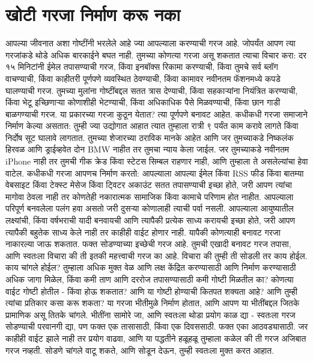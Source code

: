 \chapter{खोटी गरजा निर्माण करू नका}
आपल्या जीवनात अशा गोष्टींनी भरलेले आहे ज्या आपल्याला करण्याची गरज आहे. जोपर्यंत आपण त्या गरजांकडे थोडे अधिक बारकाईने बघत नाही.
तुमच्या कोणत्या गरजा असू शकतात त्याचा विचार करा: दर १५ मिनिटांनी ईमेल तपासण्याची गरज, किंवा इनबॉक्स रिकामा करण्याची, किंवा तुमचे सर्व ब्लॉग वाचण्याची, किंवा काहीतरी पूर्णपणे व्यवस्थित ठेवण्याची, किंवा कामावर नवीनतम फॅशनमध्ये कपडे घालण्याची गरज. तुमच्या मुलांना गोष्टींबद्दल सतत त्रास देण्याची, किंवा सहकाऱ्यांना नियंत्रित करण्याची, किंवा भेटू इच्छिणाऱ्या कोणाशीही भेटण्याची, किंवा अधिकाधिक पैसे मिळवण्याची, किंवा छान गाडी बाळगण्याची गरज.
या प्रकारच्या गरजा कुठून येतात? त्या पूर्णपणे बनावट आहेत.
कधीकधी गरजा समाजाने निर्माण केल्या असतात: तुम्ही ज्या उद्योगात आहात त्यात तुम्हाला रात्री ९ पर्यंत काम करावे लागते किंवा निर्दोष सूट घालावे लागतात. तुमच्या शेजारच्या ठराविक मानके आहेत आणि जर तुमच्याकडे निष्कलंक हिरवळ आणि ड्राईव्हवेत दोन BMW नाहीत तर तुमचा न्याय केला जाईल. जर तुमच्याकडे नवीनतम iPhone नाही तर तुमची गीक क्रेड किंवा स्टेटस सिम्बल राहणार नाही, आणि तुम्हाला ते असलेल्यांचा हेवा वाटेल.
कधीकधी गरजा आपणच निर्माण करतो: आपल्याला आपल्या ईमेल किंवा RSS फीड किंवा बातम्या वेबसाइट किंवा टेक्स्ट मेसेज किंवा ट्विटर अकाउंट सतत तपासण्याची इच्छा होते, जरी आपण त्यांचा मागोवा ठेवला नाही तर कोणतेही नकारात्मक सामाजिक किंवा कामाचे परिणाम होत नाहीत. आपल्याला परिपूर्ण बनवलेला पलंग हवा असतो जरी दुसऱ्या कोणालाही त्याची पर्वा नसली. आपल्याला आयुष्यातील लक्ष्यांची, किंवा वर्षभराची यादी बनवायची आणि त्यापैकी प्रत्येक साध्य करायची इच्छा होते, जरी आपण त्यापैकी बहुतेक साध्य केले नाही तर काहीही वाईट होणार नाही.
यापैकी कोणत्याही बनावट गरजा नाकारल्या जाऊ शकतात. फक्त सोडण्याच्या इच्छेची गरज आहे.
तुमची एखादी बनावट गरज तपासा, आणि स्वतःला विचारा की ती इतकी महत्त्वाची गरज का आहे. विचारा की तुम्ही ती सोडली तर काय होईल. काय चांगले होईल? तुम्हाला अधिक मुक्त वेळ आणि लक्ष केंद्रित करण्यासाठी आणि निर्माण करण्यासाठी अधिक जागा मिळेल, किंवा कमी ताण आणि दररोज तपासण्यासाठी कमी गोष्टी मिळतील का? कोणत्या वाईट गोष्टी होतील - किंवा होऊ शकतात? आणि या गोष्टी होण्याची कितपत शक्यता आहे? आणि तुम्ही त्यांचा प्रतिकार कसा करू शकता?
या गरजा भीतीमुळे निर्माण होतात, आणि आपण या भीतींबद्दल जितके प्रामाणिक असू तितके चांगले. भीतींना सामोरे जा, आणि स्वतःला थोडा प्रयोग काळ द्या - स्वतःला गरज सोडण्याची परवानगी द्या, पण फक्त एक तासासाठी, किंवा एक दिवससाठी. फक्त एका आठवड्यासाठी. जर काहीही वाईट झाले नाही तर प्रयोग वाढवा, आणि या पद्धतीने हळूहळू तुम्हाला कळेल की ती गरज अजिबात गरज नव्हती.
सोडणे चांगले वाटू शकते, आणि सोडून देऊन, तुम्ही स्वतःला मुक्त करत आहात.

